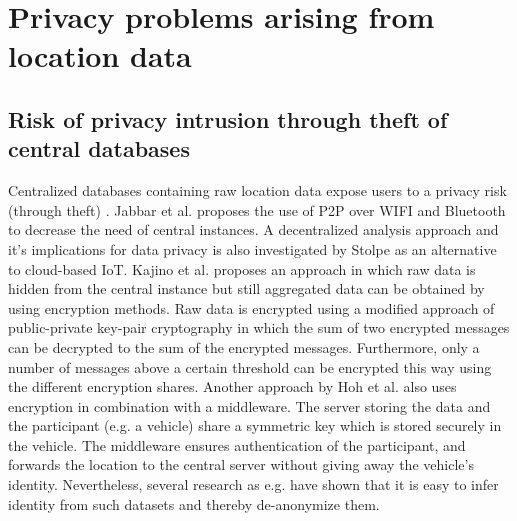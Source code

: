 \section{Privacy problems arising from location data}
\subsection{Risk of privacy intrusion through theft of central databases}
Centralized databases containing raw location data expose users to a privacy risk (through theft) \parencite{iot, hoh2006enhancing}. Jabbar et al. \parencite{p2p-android} proposes the use of P2P over WIFI and Bluetooth to decrease the need of central instances. A decentralized analysis approach and it's implications for data privacy is also investigated by Stolpe \parencite{iot} as an alternative to cloud-based IoT.
Kajino et al. \parencite{crowdsourcing} proposes an approach in which raw data is hidden from the central instance but still aggregated data can be obtained by using encryption methods. Raw data is encrypted using a modified approach of public-private key-pair cryptography in which the sum of two encrypted messages can be decrypted to the sum of the encrypted messages. Furthermore, only a number of messages above a certain threshold can be encrypted this way using the different encryption shares. 
Another approach by Hoh et al. \parencite{hoh2006enhancing} also uses encryption in combination with a middleware. The server storing the data and the participant (e.g. a vehicle) share a symmetric key which is stored securely in the vehicle. The middleware ensures authentication of the participant, and forwards the location to the central server without giving away the vehicle's identity. Nevertheless, several research as e.g. \parencite{krumm, twitter, cellphone} have shown that it is easy to infer identity from such datasets and thereby de-anonymize them. 

